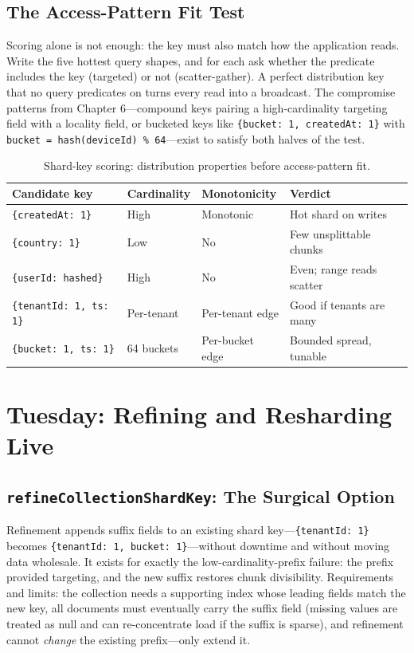 \subsection{The Access-Pattern Fit Test}
Scoring alone is not enough: the key must also match how the application reads. Write the five hottest query shapes, and for each ask whether the predicate includes the key (targeted) or not (scatter-gather). A perfect distribution key that no query predicates on turns every read into a broadcast. The compromise patterns from Chapter 6---compound keys pairing a high-cardinality targeting field with a locality field, or bucketed keys like \texttt{\{bucket: 1, createdAt: 1\}} with \texttt{bucket = hash(deviceId) \% 64}---exist to satisfy both halves of the test.

\begin{table}[H]
\centering\footnotesize
\begin{tabular}{@{}p{3.4cm}p{2.6cm}p{2.6cm}p{3.6cm}@{}}
\toprule
\textbf{Candidate key} & \textbf{Cardinality} & \textbf{Monotonicity} & \textbf{Verdict} \\
\midrule
\texttt{\{createdAt: 1\}} & High & Monotonic & Hot shard on writes \\
\texttt{\{country: 1\}} & Low & No & Few unsplittable chunks \\
\texttt{\{userId: hashed\}} & High & No & Even; range reads scatter \\
\texttt{\{tenantId: 1, ts: 1\}} & Per-tenant & Per-tenant edge & Good if tenants are many \\
\texttt{\{bucket: 1, ts: 1\}} & 64 buckets & Per-bucket edge & Bounded spread, tunable \\
\bottomrule
\end{tabular}
\caption{Shard-key scoring: distribution properties before access-pattern fit.}
\label{tab:ch7-scoring}
\end{table}

\section{Tuesday: Refining and Resharding Live}
\subsection{\texttt{refineCollectionShardKey}: The Surgical Option}
Refinement appends suffix fields to an existing shard key---\texttt{\{tenantId: 1\}} becomes \texttt{\{tenantId: 1, bucket: 1\}}---without downtime and without moving data wholesale. It exists for exactly the low-cardinality-prefix failure: the prefix provided targeting, and the new suffix restores chunk divisibility. Requirements and limits: the collection needs a supporting index whose leading fields match the new key, all documents must eventually carry the suffix field (missing values are treated as null and can re-concentrate load if the suffix is sparse), and refinement cannot \emph{change} the existing prefix---only extend it.

